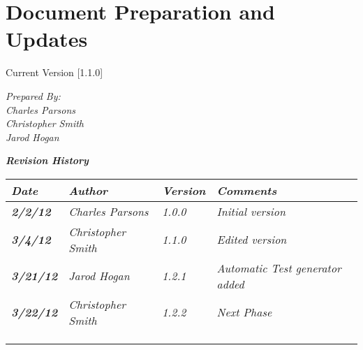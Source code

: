 
\chapter{Document Preparation and Updates}

Current Version [1.1.0]
\vspace*{5mm}

{\color{MSBlue3}
\noindent
\textit{Prepared By:}\\
\textit{Charles Parsons}\\
\textit{Christopher Smith}\\
\textit{Jarod Hogan}
}

\vfill
\noindent
{\color{color02} \textit{\textbf{Revision History}}}\\
\begin{tabular}{|>{\raggedright}p{1.5cm}|>{\raggedright}p{3cm}|>{\raggedright}p{1.5cm}|>{\raggedright}p{9cm}|}
\hline
\textit{\textbf{Date}} &  \textit{\textbf{Author}} & \textit{\textbf{Version}} & \textit{\textbf{Comments}}\tabularnewline
\hline
 \textit{\textbf{2/2/12}} & \textit{Charles Parsons} & \textit{1.0.0} & \textit{Initial version}\tabularnewline
\hline
\textit{\textbf{3/4/12}} & \textit{Christopher Smith} & \textit{1.1.0} & \textit{Edited version}\tabularnewline
\hline
\textit{\textbf{3/21/12}} & \textit{Jarod Hogan} & \textit{1.2.1} & \textit{Automatic Test generator added}\tabularnewline
 \hline
\textit{\textbf{3/22/12}} & \textit{Christopher Smith} & \textit{1.2.2} & \textit{Next Phase}\tabularnewline
\hline
 &  &  & \tabularnewline
\hline
 &  &  & \tabularnewline
\hline
 &  &  & \tabularnewline
\hline
\end{tabular}
\vfill

